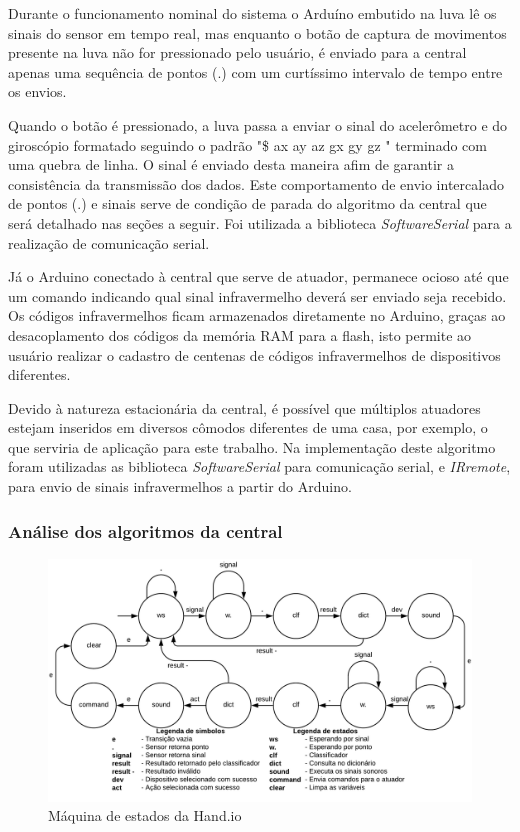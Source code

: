 Durante o funcionamento nominal do sistema o Arduíno embutido na luva lê os sinais do sensor em tempo real, mas enquanto o botão de captura de movimentos presente na luva não for pressionado pelo usuário, é enviado para a central apenas uma sequência de pontos (.) com um curtíssimo intervalo de tempo entre os envios. 

Quando o botão é pressionado, a luva passa a enviar o sinal do acelerômetro e do giroscópio formatado  seguindo o padrão "\$    ax    ay    az    gx    gy    gz    " terminado com uma quebra de linha. O sinal é enviado desta maneira afim de garantir a consistência da transmissão dos dados. Este comportamento de envio intercalado de pontos (.) e sinais serve de condição de parada do algoritmo da central que será detalhado nas seções a seguir. Foi utilizada a biblioteca \textit{SoftwareSerial} para a realização de comunicação serial.

Já o Arduino conectado à central que serve de atuador, permanece ocioso até que um comando indicando qual sinal infravermelho deverá ser enviado seja recebido. Os códigos infravermelhos ficam armazenados diretamente no Arduino, graças ao desacoplamento dos códigos da memória RAM para a flash, isto permite ao usuário realizar o cadastro de centenas de códigos infravermelhos de dispositivos diferentes. 

Devido à natureza estacionária da central, é possível que múltiplos atuadores estejam inseridos em diversos cômodos diferentes de uma casa, por exemplo, o que serviria de aplicação para este trabalho. Na implementação deste algoritmo foram utilizadas as biblioteca \textit{SoftwareSerial} para comunicação serial, e \textit{IRremote}, para envio de sinais infravermelhos a partir do Arduino.

\subsubsection{Análise dos algoritmos da central}

\begin{figure}[ht]
    \centering
    \includegraphics[width=\textwidth, keepaspectratio]{resources/maquina_estados.pdf}
    \caption{Máquina de estados da Hand.io}
    \label{fig:automato}
\end{figure}

